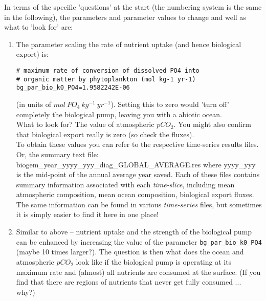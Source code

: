 \newpage
%
\noindent In terms of the specific 'questions' at the start (the numbering system is the same in the following), the parameters and parameter values to change and well as what to 'look for' are:
\vspace{1mm}

\begin{enumerate}[noitemsep]

\vspace{1mm}
\item The parameter scaling the rate of nutrient uptake (and hence biological export) is:
\vspace{-1mm}\small\begin{verbatim}
# maximum rate of conversion of dissolved PO4 into 
# organic matter by phytoplankton (mol kg-1 yr-1)
bg_par_bio_k0_PO4=1.9582242E-06
\end{verbatim}\normalsize\vspace{-1mm}
(in units of \(mol\:PO_{4} \:kg^{-1} \:yr^{-1}\)). Setting this to zero would 'turn off' completely the biological pump, leaving you with a abiotic ocean.
\vspace{1mm}
\\What to look for? The value of atmospheric \(pCO_{2}\). You might also confirm that biological export really is zero (so check the fluxes).
\vspace{1mm}
\\To obtain these values you can refer to the respective time-series results files. Or,  the summary text file: \textsf{\footnotesize biogem\_year\_yyyy\_yyy\_diag\_GLOBAL\_AVERAGE.res}
where \textsf{\footnotesize yyyy\_yyy} is the mid-point of the annual average year saved. Each of these files contains summary information associated with  each \textit{time-slice}, including mean atmospheric composition, mean ocean composition, biological export fluxes. The same information can be found in various \textit{time-series} files, but sometimes it is simply easier to find it here in one place!

\vspace{1mm}
\item Similar to above -- nutrient uptake and the strength of the biological pump can be enhanced by increasing the value of the parameter \texttt{bg\_par\_bio\_k0\_PO4} (maybe 10 times larger?).
The question is then what does the ocean and atmospheric \(pCO_{2}\) look like if the biological pump is operating at its maximum rate and (almost) all nutrients are consumed at the surface. (If you find that there are regions of nutrients that never get fully consumed ... why?)


\end{enumerate}
